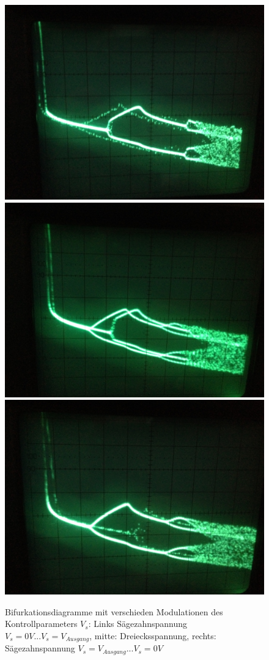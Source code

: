 \documentclass{scrartcl}
\begin{document}
\begin{figure}[!htbp]
\centering
\includegraphics[scale=0.12]{bif-ldr/dreieck_1}
\includegraphics[scale=0.12]{bif-ldr/dreieck_2}
\includegraphics[scale=0.12]{bif-ldr/dreieck_3}
\caption{Bifurkationsdiagramme mit verschieden Modulationen des Kontrollparameters $V_s$: Links Sägezahnspannung $V_s=0V...V_s=V_{Ausgang}$, mitte: Dreiecksspannung, rechts: Sägezahnspannung $V_s=V_{Ausgang}...V_s=0V$}
\label{fig:ldr-modellierung}
\end{figure}
\end{document}
